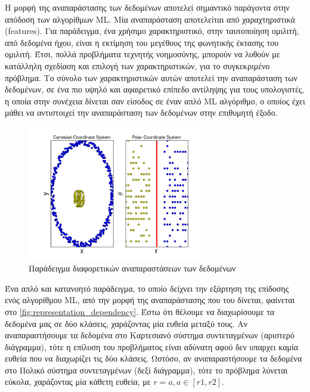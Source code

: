 Η μορφή της αναπαράστασης των δεδομένων αποτελεί σημαντικό παράγοντα στην
απόδοση των αλγορίθμων ML. Μία αναπαράσταση αποτελείται από χαραχτηριστικά (features).
Για παράδειγμα, ένα χρήσιμο χαρακτηριστικό, στην ταυτοποίηση ομιλιτή, από δεδομένα ήχου,
είναι η εκτίμηση του μεγέθους της φωνητικής έκτασης του ομιλιτή.
Έτσι, πολλά προβλήματα τεχνητής νοημοσύνης, μπορούν να λυθούν
με κατάλληλη σχεδίαση και επιλογή των χαρακτηριστικών, για το συγκεκριμένο
πρόβλημα. Το σύνολο των χαρακτηριστικών αυτών αποτελεί την αναπαράσταση των δεδομένων,
σε ένα πιο υψηλό και αφαιρετικό επίπεδο αντίληψης για τους υπολογιστές, η οποία
στην συνέχεια δίνεται σαν είσοδος σε έναν απλό ML αλγόριθμο, ο οποίος έχει
μάθει να αντιστοιχεί την αναπαράσταση των δεδομένων στην επιθυμητή έξοδο.
    \begin{figure}[!h]
      \centering
      \includegraphics[width=0.7\textwidth]{./images/chapter3/representation_dependency.png}
      \caption[Παράδειγμα διαφορετικών αναπαραστάσεων των δεδομένων]{Παράδειγμα διαφορετικών αναπαραστάσεων των δεδομένων}
      \label{fig:representation_dependency}
    \end{figure}

    Ένα απλό και κατανοητό παράδειγμα, το οποίο δείχνει την εξάρτηση της επίδοσης ενός
    αλγορίθμου ML, από την μορφή της αναπαράστασης που του δίνεται, φαίνεται στο
    \autoref{fig:representation_dependency}. Έστω ότι θέλουμε να
    διαχωρίσουμε τα δεδομένα μας σε δύο κλάσεις, χαράζοντας μία ευθεία
    μεταξύ τους. Αν αναπαραστήσουμε τα δεδομένα στο Καρτεσιανό σύστημα συντεταγμένων (αριστερό διάγραμμα),
    τότε η επίλυση του προβλήματος είναι αδύνατη αφού δεν υπαρχει καμία ευθεία
    που να διαχωρίζει τις δύο κλάσεις. Ωστόσο, αν αναπαραστήσουμε τα δεδομένα
    στο Πολικό σύστημα συντεταγμένων (δεξί διάγραμμα), τότε το πρόβλημα λύνεται
    εύκολα, χαράζοντας μία κάθετη ευθεία, με $r  = a, a \in [r1, r2]$.

